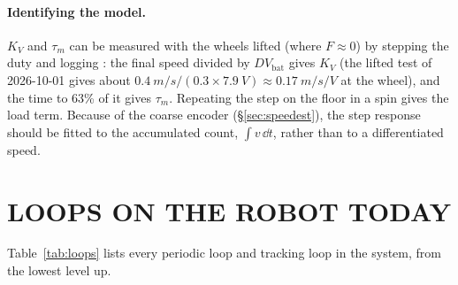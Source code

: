 \paragraph{Identifying the model.} $K_V$ and $\tau_m$ can be measured with
the wheels lifted (where $F\approx0$) by stepping the duty and logging
: the final speed divided by $D V_{\mathrm{bat}}$ gives
$K_V$ (the lifted test of 2026-10-01 gives about
$\SI{0.4}{m/s}/(0.3\times\SI{7.9}{V}) \approx \SI{0.17}{m/s/V}$ at the
wheel), and the time to 63\% of it gives $\tau_m$. Repeating the step on the
floor in a spin gives the load term. Because of the coarse encoder
(\S\ref{sec:speedest}), the step response should be fitted to the
accumulated count, $\int v\,\dd t$, rather than to a differentiated speed.

\section{LOOPS ON THE ROBOT TODAY}
\label{sec:loops}

Table~\ref{tab:loops} lists every periodic loop and tracking loop in the
system, from the lowest level up.

